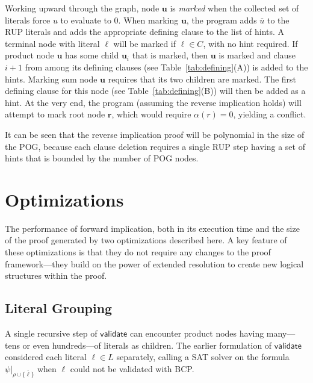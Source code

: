 \documentclass[letterpaper,USenglish,cleveref, autoref, thm-restate]{lipics-v2021}
\newcommand{\obar}[1]{\overline{#1}}
\newcommand{\lit}{\ell}
\newcommand{\assign}{\alpha}
\newcommand{\passign}{\rho}
\newcommand{\validate}{\textsf{validate}}
\newcommand{\makenode}[1]{\mathbf{#1}}
\newcommand{\nodeu}{\makenode{u}}
\newcommand{\noder}{\makenode{r}}
\newcommand{\simplify}[2]{#1|_{#2}}
\begin{document}
Working upward through the graph, node $\nodeu$ is {\em marked} when
the collected set of literals force $u$ to evaluate to $0$.  When marking $\nodeu$, the
program adds $\obar{u}$ to the RUP literals and adds the appropriate
defining clause to the list of hints.  A terminal node with literal
$\lit$ will be marked if $\lit \in C$, with no hint required.  If
product node $\nodeu$ has some child $\nodeu_i$ that is marked, then
$\nodeu$ is marked and clause $i+1$ from among its defining clauses (see Table~\ref{tab:defining}(A)) is
added to the hints.  Marking sum node $\nodeu$ requires that its two children are marked.
The first defining
clause for this node (see Table~\ref{tab:defining}(B)) will then be added as a hint.  At the very end, the program
(assuming the reverse implication holds) will attempt to mark root
node $\noder$, which would require $\assign(r) = 0$, yielding a
conflict.

It can be seen that the reverse implication proof will be polynomial in the size of the POG\@, because
each clause deletion requires a single RUP step having a set of hints that is
bounded by the number of POG nodes.

\section{Optimizations}

The performance of forward implication, both in its execution time and
the size of the proof generated by two optimizations described here.
A key feature of these optimizations is that they do not require any changes to the
proof framework---they build on the power of extended resolution to
create new logical structures within the proof.

\subsection{Literal Grouping}

A single recursive step of $\validate$ can encounter product nodes
having many---tens or even hundreds---of literals as children.  The earlier formulation of $\validate$
considered each literal $\lit \in L$ separately,
calling a SAT solver
on the formula  $\simplify{\psi}{\passign \cup \{\obar{\lit}\}}$ when $\lit$ could not be validated with BCP\@.
\end{document}
